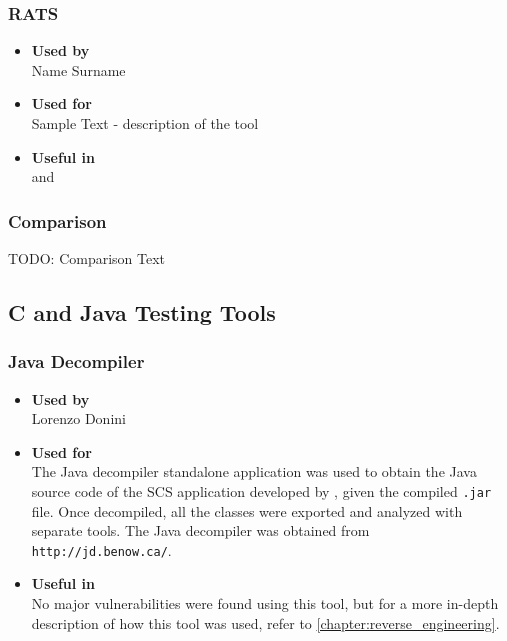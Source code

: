 \subsubsection*{RATS}
\begin{itemize}
	\item \textbf{Used by}\\ Name Surname
	\item \textbf{Used for}\\ Sample Text - description of the tool
	\item \textbf{Useful in}\\  and 
\end{itemize}

\subsubsection*{Comparison}
TODO: Comparison Text


\subsection*{C and Java Testing Tools}

\subsubsection*{Java Decompiler}
\begin{itemize}
	\item \textbf{Used by}\\ Lorenzo Donini
	\item \textbf{Used for}\\ The Java decompiler standalone application was used to obtain the Java source code of the SCS application developed by \bs, given the compiled \texttt{.jar} file. Once decompiled, all the classes were exported and analyzed with separate tools. The Java decompiler was obtained from \texttt{http://jd.benow.ca/}.
	\item \textbf{Useful in}\\ No major vulnerabilities were found using this tool, but for a more in-depth description of how this tool was used, refer to \ref{chapter:reverse_engineering}.
\end{itemize}

